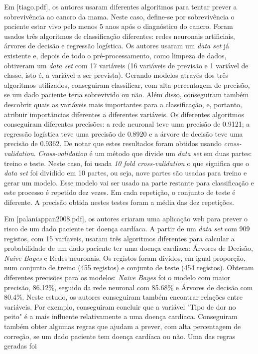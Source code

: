 Em [tiago.pdf], os autores usaram diferentes algoritmos para tentar prever a sobrevivência ao cancro da mama. Neste caso, define-se por sobrevivência o paciente estar vivo pelo menos 5 anos após o diagnóstico do cancro. Foram usados três algoritmos de classificação diferentes: redes neuronais artificiais, árvores de decisão e regressão logística. Os autores usaram um \textit{data set} já existente e, depois de todo o pré-processamento, como limpeza de dados, obtiveram um \textit{data set} com 17 variáveis (16 variáveis de previsão e 1 variável de classe, isto é, a variável a ser prevista). Gerando modelos através dos três algoritmos utilizados, conseguiram classificar, com alta percentagem de precisão, se um dado paciente teria sobrevivido ou não. Além disso, conseguiram também descobrir quais as variáveis mais importantes para a classificação, e, portanto, atribuir importâncias diferentes a diferentes variáveis. Os diferentes algoritmos conseguiram diferentes precisões: a rede neuronal teve uma precisão de 0.9121; a regressão logística teve uma precisão de 0.8920 e a árvore de decisão teve uma precisão de 0.9362. De notar que estes resultados foram obtidos usando \textit{cross-validation}. \textit{Cross-validation} é um método que divide um \textit{data set} em duas partes: treino e teste. Neste caso, foi usada \textit{10 fold cross-validation} o que significa que o \textit{data set} foi dividido em 10 partes, ou seja, nove partes são usadas para treino e gerar um modelo. Esse modelo vai ser usado na parte restante para classificação e este processo é repetido dez vezes. Em cada repetição, o conjunto de teste é diferente. A precisão obtida nestes testes foram a média das dez repetições.

Em [palaniappan2008.pdf], os autores criaram uma aplicação web para prever o risco de um dado paciente ter doença cardíaca. A partir de um \textit{data set} com 909 registos, com 15 varíaveis, usaram três algoritmos diferentes para calcular a probabilidade de um dado paciente ter uma doença cardíaca: Árvores de Decisão, \textit{Naive Bayes} e Redes neuronais. Os registos foram dividos, em igual proporção, num conjunto de treino (455 registos) e conjunto de teste (454 registos). Obteram diferentes precisões para os modelos: \textit{Naive Bayes} foi o modelo com maior precisão, 86.12\%, seguido da rede neuronal com 85.68\% e Árvores de decisão com 80.4\%. Neste estudo, os autores conseguiram também encontrar relações entre variáveis. Por exemplo, conseguiram concluir que a variável "Tipo de dor no peito" é a mais influente relativamente a uma doença cardíaca. Conseguiram também obter algumas regras que ajudam a prever, com alta percentagem de correção, se um dado paciente tem doença cardíaca ou não. Uma das regras geradas foi 

